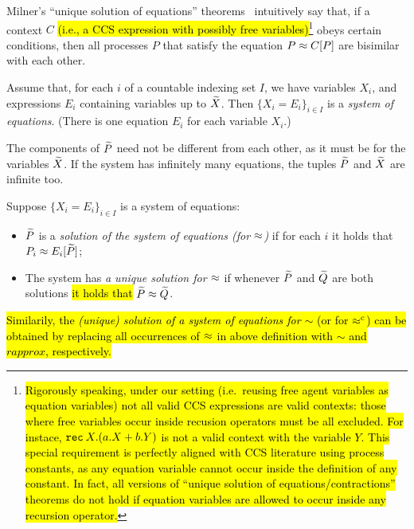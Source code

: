 Milner's ``unique solution of equations'' theorems~\cite{Mil89} intuitively
say that, if a context $C$ \hl{(i.e., a CCS expression with possibly
free variables)}\footnote{\hl{Rigorously speaking, under our setting
(i.e.~reusing free agent variables as equation variables) not all
valid CCS expressions
are valid contexts: those where free variables occur inside
recusion operators must be all excluded. For instace, ${\tt rec}\: X . (a.X +
b.Y)$ is not a valid context with the variable $Y$. This special requirement
is perfectly aligned with CCS literature using process constants, as any
equation variable cannot occur inside the definition of any
constant. In fact, all versions of ``unique solution of
equations/contractions'' theorems do not hold if equation variables
are allowed to occur inside any recursion operator.}} obeys certain conditions,
then all processes $P$ that satisfy the equation $P \approx C [P]$ are
bisimilar with each other.

\begin{definition}[equations] %
  \label{def:equation}
Assume that, for each $i$ of 
 a countable indexing set $I$, we have variables $X_i$, and expressions
$E_i$ containing variables up to $\widetilde X$. Then 
$\{ X_i = E_i\}_{i\in I}$ is 
  a \emph{system of equations}. (There is one equation $E_i$ for each variable $X_i$.)
\end{definition}

The components of $\widetilde P$ need not be
different from each other, as it must be for the variables $\widetilde X$.
If the system has infinitely many equations, the  tuples $\widetilde P$ and $\widetilde X$ are infinite too.

\begin{definition}
  \label{def:solution}
Suppose $\{ X_i = E_i\}_{i\in I}$ is a system of equations: 
\begin{itemize}
\item
 $\widetilde P$ is a \emph{solution of the system of equations (for $\approx$)} 
if for each $i$ it holds that $P_i \approx E_i [\widetilde P]$;
\item The system has \emph{a unique solution for $\approx$}  if whenever 
 $\widetilde P$ and $\widetilde Q$ are both solutions \hl{it holds that} $\widetilde P \approx \widetilde Q$. 
\end{itemize} 
 \end{definition}
\hl{Similarily, the \emph{(unique) solution of a system of equations for $\sim$}
(or for $\mathrel{\approx^{\rm{c}}}$) can be obtained by replacing all occurrences of $\approx$
in above definition with $\sim$ and $rapprox$, respectively.}

